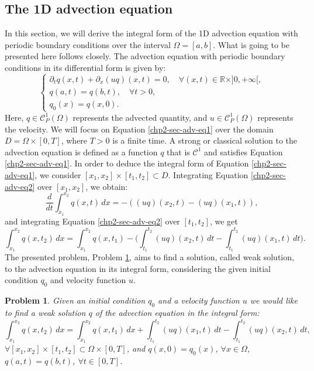 \subsection{The 1D advection equation}
In this section, we will derive the integral form of the 1D advection equation with periodic boundary conditions over the interval $\Omega=[a,b]$.
What is going to be presented here follows \citet{leveque:1990,leveque:2002} closely.
The advection equation with periodic boundary conditions in its differential form is given by:
\begin{equation}
	\label{chp2-sec-adv-eq1}
	\begin{cases}
		{\partial_t q}(x, t) + {\partial_x (uq)}(x, t)
		= 0, \quad \forall (x,t) \in \mathbb{R}\times ]0, +\infty[,\\
		{q}(a, t) = {q}(b, t), \quad \forall t>0,\\
		q_0(x) = q(x,0).
	\end{cases}
\end{equation}
Here, $q \in \mathcal{C}_P^1{(\Omega)}$ represents the advected quantity, and $u \in \mathcal{C}_P^1{(\Omega)}$ represents the velocity.
We will focus on Equation \eqref{chp2-sec-adv-eq1} over the domain $D = \Omega\times[0,T]$, where $T>0$ is a finite time.
A strong or classical solution to the advection equation is defined as a function ${q}$ that is $\mathcal{C}^1$ 
and satisfies Equation \eqref{chp2-sec-adv-eq1}.
In order to deduce the integral form of Equation \eqref{chp2-sec-adv-eq1}, we consider
$[x_1, x_2]\times[t_1,t_2]\subset D$. 
Integrating Equation \eqref{chp2-sec-adv-eq2} over $[x_1, x_2]$, we obtain:
\begin{equation}
    \label{chp2-sec-adv-eq2}
	\frac{d}{dt} \int_{x_1}^{x_2} q(x,t) \,dx =  
	-({(uq)}(x_2,t) - {(uq)}(x_1,t)) ,
\end{equation}
and integrating Equation \eqref{chp2-sec-adv-eq2} over $[t_1,t_2]$, we get
\begin{equation}
    \label{chp2-sec-adv-eq3}
    \int_{x_1}^{x_2} q(x,t_2) \,dx=  \int_{x_1}^{x_2} q(x,t_1)
	-\bigg( \int_{t_1}^{t_2} 
	{(uq)}(x_2, t) \,dt - 
	\int_{t_1}^{t_2}{(uq)}(x_1, t) \,dt \bigg).
\end{equation}
The presented problem, Problem \ref{chp2-sec2-prob1}, aims to find a solution, called weak solution, to the advection equation
in its integral form, considering the given initial condition ${q}_0$ and velocity function $u$.
\theoremstyle{plain} 
\newtheorem{prob}{Problem}[chapter]
\begin{prob}
	\label{chp2-sec2-prob1}
	Given an initial condition ${q}_0$ and a velocity function $u$  we would like to find a weak solution ${q}$
	of the advection equation in the integral form:
	\begin{equation*}
	        \int_{x_1}^{x_2} {q}(x, t_2) \,dx = 
       		\int_{x_1}^{x_2} {q}(x, t_1) \,dx + 
        	\int_{t_1}^{t_2} {(uq)}(x_1, t) \,dt -
		\int_{t_1}^{t_2}{(uq)}(x_2, t) \,dt ,
	\end{equation*}
	$\forall [x_1, x_2]\times[t_1, t_2] \subset \Omega \times [0,T]$, 
	and
	${q}(x,0) = {q}_0(x)$, $\forall x \in \Omega$, $q(a,t)=q(b,t)$, $\forall t \in [0,T]$.
\end{prob}
